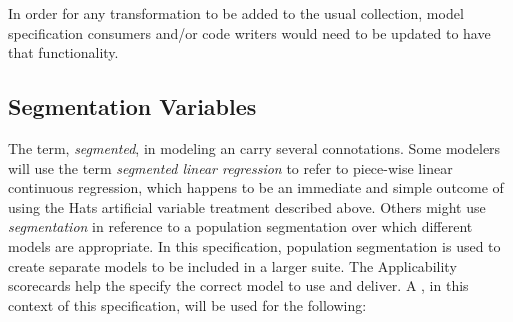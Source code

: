\documentclass[10pt]{article}
\begin{document}
\noindent
\tallstrut In order for any transformation to be added to the usual collection, model specification consumers and/or 
code writers would need to be updated to have that functionality.  


\subsection{Segmentation Variables}\label{segmentation_variable}

The term, {\em segmented}, in modeling an carry several connotations.  Some modelers 
will use the term {\em segmented linear regression}
to refer to piece-wise linear continuous regression, which happens to be an immediate and simple outcome of using the Hats artificial
variable treatment described above.   Others might use {\em segmentation} in reference to a population segmentation over which
different models are appropriate.  In this specification, population segmentation is used to create separate models
to be included in a larger suite.  The Applicability scorecards help the specify the correct model to use and deliver.  
A , in this context of this specification, will be used for the following:
\end{document}
